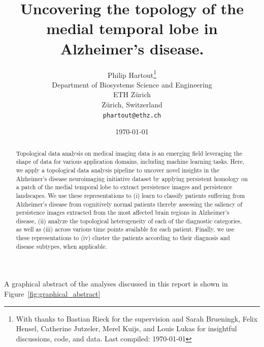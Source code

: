 \documentclass{article}
\title{Uncovering the topology of the medial temporal lobe in Alzheimer's disease.}
\author{Philip Hartout\thanks{With thanks to Bastian Rieck for the supervision and Sarah
  Brueningk, Felix Hensel, Catherine Jutzeler, Merel Kuijs, and Louis Lukas for insightful discussions, code, and data. Last compiled: \today}\\ Department of Biosystems Science and Engineering\\ ETH Zürich\\ Zürich, Switzerland \\ \texttt{phartout@ethz.ch} \\ } \date{\today}
\begin{document}
\maketitle

\begin{abstract}
Topological data analysis on medical imaging data is an emerging field leveraging the shape of data
for various application domains, including machine learning tasks. Here, we apply a topological data
analysis pipeline to uncover novel insights in the Alzheimer's disease neuroimaging initiative
dataset by applying persistent homology on a patch of the medial temporal lobe to extract
persistence images and persistence landscapes. We use these representations to (i) learn to classify
patients suffering from Alzheimer's disease from cognitively normal patients thereby assessing the
saliency of persistence images extracted from the most affected brain regions in Alzheimer's
disease, (ii) analyze the topological heterogeneity of each of the diagnostic categories, as well as
(iii) across various time points available for each patient. Finally, we use these representations
to (iv) cluster the patients according to their diagnosis and disease subtypes, when applicable.
\end{abstract}

A graphical abstract of the analyses discussed in this report is shown in
Figure~\ref{fig:graphical_abstract}
\end{document}
